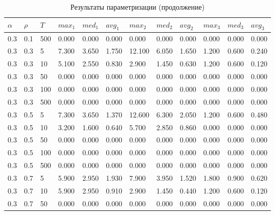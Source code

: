 \documentclass{bmstu}
\begin{document}
	\begin{longtable}{|p{}|p{}|p{}|p{}|p{}|p{}|p{}|p{}|p{}|p{}|p{}|p{}|}
		\caption{\label{tab:params1}Результаты параметризации (продолжение)} \\
		\hline
		$\alpha$ & $\rho$ & $T$ & $max_1$ & $med_1$ & $avg_1$  & $max_2$ & $med_2$ & $avg_2$  & $max_3$ & $med_3$ & $avg_3$ \\
		\hline
		0.3 & 0.1 & 500 & 0.000 & 0.000 & 0.000 & 0.000 & 0.000 & 0.000 & 0.000 & 0.000 & 0.000 \\
		\hline
		0.3 & 0.3 & 5 & 7.300 & 3.650 & 1.750 & 12.100 & 6.050 & 1.650 & 1.200 & 0.600 & 0.240 \\
		\hline
		0.3 & 0.3 & 10 & 5.100 & 2.550 & 0.830 & 2.900 & 1.450 & 0.630 & 1.200 & 0.600 & 0.120 \\
		\hline
		0.3 & 0.3 & 50 & 0.000 & 0.000 & 0.000 & 0.000 & 0.000 & 0.000 & 0.000 & 0.000 & 0.000 \\
		\hline
		0.3 & 0.3 & 100 & 0.000 & 0.000 & 0.000 & 0.000 & 0.000 & 0.000 & 0.000 & 0.000 & 0.000 \\
		\hline
		0.3 & 0.3 & 500 & 0.000 & 0.000 & 0.000 & 0.000 & 0.000 & 0.000 & 0.000 & 0.000 & 0.000 \\
		\hline
		0.3 & 0.5 & 5 & 7.300 & 3.650 & 1.370 & 12.600 & 6.300 & 2.050 & 1.200 & 0.600 & 0.480 \\
		\hline
		0.3 & 0.5 & 10 & 3.200 & 1.600 & 0.640 & 5.700 & 2.850 & 0.860 & 0.000 & 0.000 & 0.000 \\
		\hline
		0.3 & 0.5 & 50 & 0.000 & 0.000 & 0.000 & 0.000 & 0.000 & 0.000 & 0.000 & 0.000 & 0.000 \\
		\hline
		0.3 & 0.5 & 100 & 0.000 & 0.000 & 0.000 & 0.000 & 0.000 & 0.000 & 0.000 & 0.000 & 0.000 \\
		\hline
		0.3 & 0.5 & 500 & 0.000 & 0.000 & 0.000 & 0.000 & 0.000 & 0.000 & 0.000 & 0.000 & 0.000 \\
		\hline
		0.3 & 0.7 & 5 & 5.900 & 2.950 & 1.930 & 7.900 & 3.950 & 1.520 & 1.800 & 0.900 & 0.620 \\
		\hline
		0.3 & 0.7 & 10 & 5.900 & 2.950 & 0.910 & 2.900 & 1.450 & 0.440 & 1.200 & 0.600 & 0.120 \\
		\hline
		0.3 & 0.7 & 50 & 0.000 & 0.000 & 0.000 & 0.000 & 0.000 & 0.000 & 0.000 & 0.000 & 0.000 \\

\end{longtable}
\end{document}
